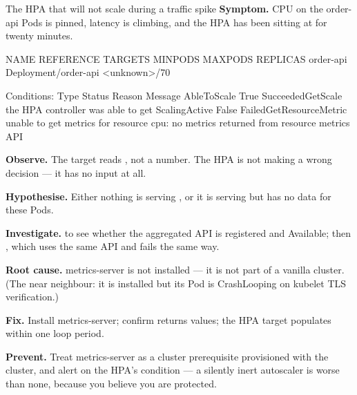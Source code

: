 \begin{debuglab}{The HPA that will not scale during a traffic spike}
\textbf{Symptom.} CPU on the order-api Pods is pinned, latency is climbing, and the HPA has been sitting at  for twenty minutes.

\begin{outbox}
NAME        REFERENCE              TARGETS         MINPODS  MAXPODS  REPLICAS
order-api   Deployment/order-api   <unknown>/70%

Conditions:
  Type           Status  Reason                  Message
  AbleToScale    True    SucceededGetScale       the HPA controller was able to get
  ScalingActive  False   FailedGetResourceMetric unable to get metrics for resource
                                                 cpu: no metrics returned from
                                                 resource metrics API
\end{outbox}

\begin{tickcheck}
  \item \textbf{Observe.} The target reads , not a number. The HPA is not making a wrong decision --- it has no input at all.
  \item \textbf{Hypothesise.} Either nothing is serving , or it is serving but has no data for these Pods.
  \item \textbf{Investigate.}  to see whether the aggregated API is registered and Available; then , which uses the same API and fails the same way.
  \item \textbf{Root cause.} metrics-server is not installed --- it is not part of a vanilla cluster. (The near neighbour: it is installed but its Pod is CrashLooping on kubelet TLS verification.)
  \item \textbf{Fix.} Install metrics-server; confirm  returns values; the HPA target populates within one loop period.
  \item \textbf{Prevent.} Treat metrics-server as a cluster prerequisite provisioned with the cluster, and alert on the HPA's  condition --- a silently inert autoscaler is worse than none, because you believe you are protected.
\end{tickcheck}
\end{debuglab}

